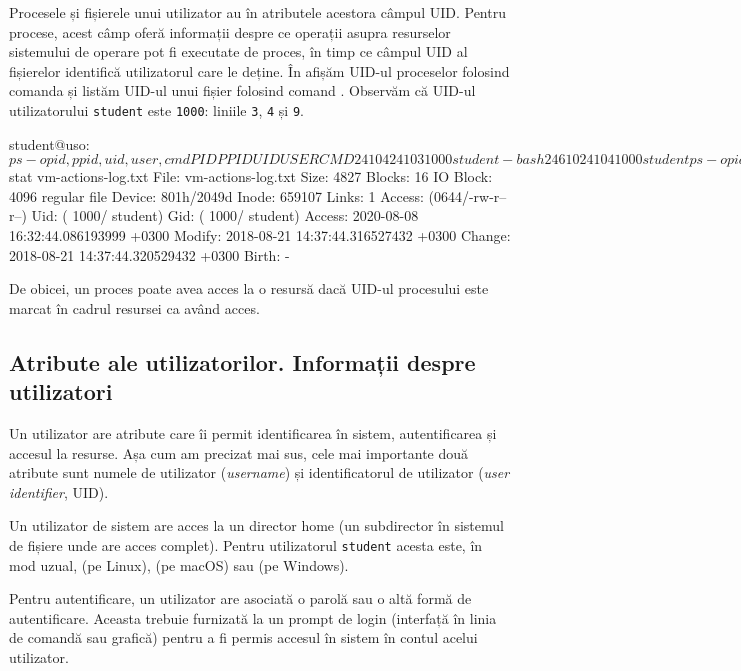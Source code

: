 Procesele și fișierele unui utilizator au în atributele acestora câmpul UID.
Pentru procese, acest câmp oferă informații despre ce operații asupra resurselor sistemului de operare pot fi executate de proces, în timp ce câmpul UID al fișierelor identifică utilizatorul care le deține.
În  afișăm UID-ul proceselor folosind comanda  și listăm UID-ul unui fișier folosind comand .
Observăm că UID-ul utilizatorului \texttt{student} este \texttt{1000}: liniile \texttt{3}, \texttt{4} și \texttt{9}.

\begin{screen}[caption={Afișare UID pentru procese și fișiere},label={lst:user:print-uid}]
student@uso:~$ ps -o pid,ppid,uid,user,cmd
  PID  PPID   UID USER     CMD
24104 24103  1000 student  -bash
24610 24104  1000 student  ps -o pid,ppid,uid,user,cmd
student@uso:~$ stat vm-actions-log.txt
  File: vm-actions-log.txt
  Size: 4827      	Blocks: 16         IO Block: 4096   regular file
Device: 801h/2049d	Inode: 659107      Links: 1
Access: (0644/-rw-r--r--)  Uid: ( 1000/ student)   Gid: ( 1000/ student)
Access: 2020-08-08 16:32:44.086193999 +0300
Modify: 2018-08-21 14:37:44.316527432 +0300
Change: 2018-08-21 14:37:44.320529432 +0300
 Birth: -
\end{screen}

De obicei, un proces poate avea acces la o resursă dacă UID-ul procesului este marcat în cadrul resursei ca având acces.

\subsection{Atribute ale utilizatorilor. Informații despre utilizatori}
\label{sec:user:attributes}

Un utilizator are atribute care îi permit identificarea în sistem, autentificarea și accesul la resurse.
Așa cum am precizat mai sus, cele mai importante două atribute sunt numele de utilizator (\textit{username}) și identificatorul de utilizator (\textit{user identifier}, UID).

Un utilizator de sistem are acces la un director home (un subdirector în sistemul de fișiere unde are acces complet).
Pentru utilizatorul \texttt{student} acesta este, în mod uzual,  (pe Linux),  (pe macOS) sau  (pe Windows).

Pentru autentificare, un utilizator are asociată o parolă sau o altă formă de autentificare.
Aceasta trebuie furnizată la un prompt de login (interfață în linia de comandă sau grafică) pentru a fi permis accesul în sistem în contul acelui utilizator.

